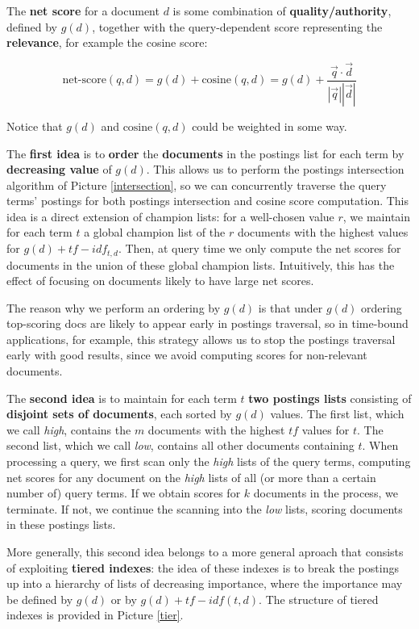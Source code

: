 The \textbf{net score} for a document $d$ is some combination of \textbf{quality/authority}, defined by $g(d)$, together with the query-dependent score representing the \textbf{relevance}, for example the cosine score:

$$
\text{net-score}(q,d) = g(d) + \text{cosine}(q,d) = g(d) + \frac{\Vec{q} \cdot \Vec{d}}{|\Vec{q}||\Vec{d}|}
$$

Notice that $g(d)$ and $\text{cosine}(q,d)$ could be weighted in some way.

The \textbf{first idea} is to \textbf{order} the \textbf{documents} in the postings list for each term by \textbf{decreasing value} of $g(d)$. This allows us to perform the postings intersection algorithm of Picture \ref{intersection}, so we can concurrently traverse the query terms' postings for both postings intersection and cosine score computation. This idea is a direct extension of champion lists: for a well-chosen value $r$, we maintain for each term $t$ a global champion list of the $r$ documents with the highest values for $g(d) + tf-idf_{t,d}$. Then, at query time we only compute the net scores for documents in the union of these global champion lists. Intuitively, this has the effect of focusing on documents likely to have large net scores. 

The reason why we perform an ordering by $g(d)$ is that under $g(d)$ ordering top-scoring docs are likely to appear early in postings traversal, so in time-bound applications, for example, this strategy allows us to stop the postings traversal early with good results, since we avoid computing scores for non-relevant documents.

The \textbf{second idea} is to maintain for each term $t$ \textbf{two postings lists} consisting of \textbf{disjoint sets of documents}, each sorted by $g(d)$ values. The first list, which we call \textit{high}, contains the $m$ documents with the highest $tf$ values for $t$. The second list, which we call \textit{low}, contains all other documents containing $t$. When processing a query, we first scan only the \textit{high} lists of the query terms, computing net scores for any document on the \textit{high} lists of all (or more than a certain number of) query terms. If we obtain scores for $k$ documents in the process, we terminate. If not, we continue the scanning into the \textit{low} lists, scoring documents in these postings lists.

More generally, this second idea belongs to a more general aproach that consists of exploiting \textbf{tiered indexes}: the idea of these indexes is to break the postings up into a hierarchy of lists of decreasing importance, where the importance may be defined by $g(d)$ or by $g(d) + tf-idf(t,d)$. The structure of tiered indexes is provided in Picture \ref{tier}.

